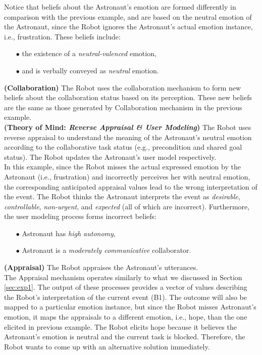 \noindent Notice that beliefs about the Astronaut's emotion are formed
differently in comparison with the previous example, and are based on the
neutral emotion of the Astronaut, since the Robot ignores the Astronaut's actual
emotion instance, i.e., frustration. These beliefs include:

\begin{itemize}
  \item[$\bullet$] the existence of a \textit{neutral-valenced} emotion,
  \item[$\bullet$] and is verbally conveyed as \textit{neutral} emotion.
\end{itemize}

\noindent\textbf{(Collaboration)} The Robot uses the collaboration mechanism to
form new beliefs about the collaboration status based on its perception. These
new beliefs are the same as those generated by Collaboration mechanism in the
previous example.\\

\noindent\textbf{(Theory of Mind: \textit{Reverse Appraisal \& User Modeling})}
The Robot uses reverse appraisal to understand the meaning of the Astronaut's
neutral emotion according to the collaborative task status (e.g., precondition
and shared goal status). The Robot updates the Astronaut's user model
respectively.\\

In this example, since the Robot misses the actual expressed emotion by the
Astronaut (i.e., frustration) and incorrectly perceives her with neutral
emotion, the corresponding anticipated appraisal values lead to the wrong
interpretation of the event. The Robot thinks the Astronaut interprets the
event as \textit{desirable}, \textit{controllable}, \textit{non-urgent}, and
\textit{expected} (all of which are incorrect). Furthermore, the user modeling
process forms incorrect beliefs:

\begin{itemize}
  \item[$\bullet$] Astronaut has \textit{high autonomy},
  \item[$\bullet$] Astronaut is a \textit{moderately communicative}
  collaborator.
\end{itemize}

\noindent\textbf{(Appraisal)} The Robot appraises the Astronaut's utterances.\\

The Appraisal mechanism operates similarly to what we discussed in Section
\ref{sec:exp1}. The output of these processes provides a vector of values
describing the Robot's interpretation of the current event (B1). The outcome
will also be mapped to a particular emotion instance, but since the Robot misses
Astronaut's emotion, it maps the appraisals to a different emotion, i.e.,
hope, than the one elicited in previous example. The Robot elicits hope because
it believes the Astronaut's emotion is neutral and the current task is blocked.
Therefore, the Robot wants to come up with an alternative solution
immediately.\\

